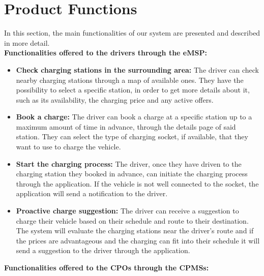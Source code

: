 \section{Product Functions} %
\label{sec:productFunctions}
In this section, the main functionalities of our system are presented and described in more detail. \\
\textbf{Functionalities offered to the drivers through the eMSP:}
\begin{itemize}
    \item \textbf{Check charging stations in the surrounding area:} 
    The driver can check nearby charging stations through a map of available ones. They have the possibility to select a specific station, in order to get more details about it, such as its availability, the charging price and any active offers.
    \item \textbf{Book a charge:} The driver can book a charge at a specific station up to a maximum amount of time in advance, through the details page of said station. They can select the type of charging socket, if available, that they want to use to charge the vehicle.
    \item \textbf{Start the charging process:} The driver, once they have driven to the charging station they booked in advance, can initiate the charging process through the application. If the vehicle is not well connected to the socket, the application will send a notification to the driver.
    \item \textbf{Proactive charge suggestion:} The driver can receive a suggestion to charge their vehicle based on their schedule and route to their destination. The system will evaluate the charging stations near the driver's route and if the prices are advantageous and the charging can fit into their schedule it will send a suggestion to the driver through the application.
\end{itemize}
\textbf{Functionalities offered to the CPOs through the CPMSs:}
